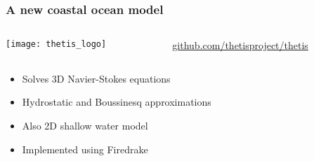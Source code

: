 \documentclass{beamer}
\begin{document}
\begin{frame}
\frametitle{A new coastal ocean model}
\begin{columns}
  \begin{column}{0.25\textwidth}
    \texttt{[image: thetis\_logo]}
  \end{column}
  \begin{column}{0.75\textwidth} {\small
      \url{github.com/thetisproject/thetis}}
  \end{column}
\end{columns}
\begin{columns}
  \begin{column}{0.9\textwidth}
    \begin{itemize}
    \item Solves 3D Navier-Stokes equations
    \item Hydrostatic and Boussinesq approximations
    \item Also 2D shallow water model
    \item Implemented using Firedrake
    \end{itemize}
  \end{column}
\end{columns}
\end{frame}
\end{document}
